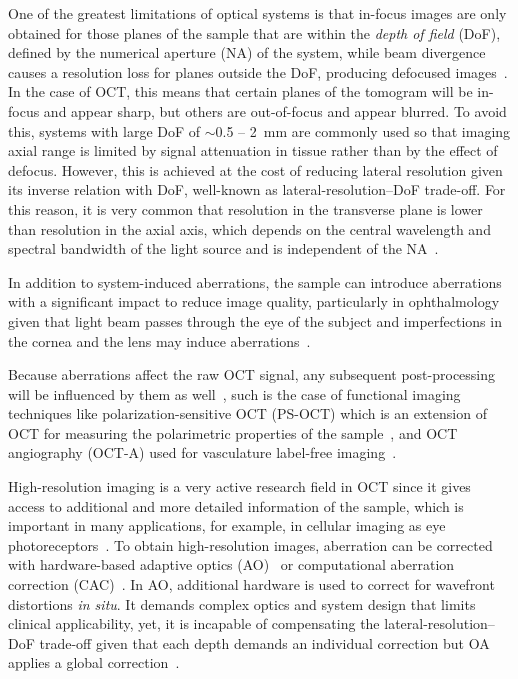 One of the greatest limitations of optical systems is that in-focus images are only obtained for those planes of the sample that are within the \textit{depth of field} (DoF), defined by the numerical aperture (NA) of the system, while beam divergence causes a resolution loss for planes outside the DoF, producing defocused images~\cite{Yasuno2006_Noniterative, Ralston2006_Interferometric}. In the case of OCT, this means that certain planes of the tomogram will be in-focus and appear sharp, but others are out-of-focus and appear blurred. To avoid this, systems with large DoF of $\sim$0.5 -- 2~mm are commonly used so that imaging axial range is limited by signal attenuation in tissue rather than by the effect of defocus. However, this is achieved at the cost of reducing lateral resolution given its inverse relation with DoF, well-known as lateral-resolution--DoF trade-off. For this reason, it is very common that resolution in the transverse plane is lower than resolution in the axial axis, which depends on the central wavelength and spectral bandwidth of the light source and is independent of the NA~\cite{Fujimoto2015_Introduction}.

In addition to system-induced aberrations, the sample can introduce aberrations with a significant impact to reduce image quality, particularly in ophthalmology given that light beam passes through the eye of the subject and imperfections in the cornea and the lens may induce aberrations~\cite{Walsh1984_Objective, Liang1997_Aberrations}.

Because aberrations affect the raw OCT signal, any subsequent post-processing will be influenced by them as well~\cite{Cense2009_Retinal, Park2020_Angiographic}, such is the case of functional imaging techniques like polarization-sensitive OCT (PS-OCT) which is an extension of OCT for measuring the polarimetric properties of the sample~\cite{deBoer1997_Twodimensional}, and OCT angiography (OCT-A) used for vasculature label-free imaging~\cite{Wang2007_Three}.

High-resolution imaging is a very active research field in OCT since it gives access to additional and more detailed information of the sample, which is important in many applications, for example, in cellular imaging as eye photoreceptors~\cite{Zhang2006_Highspeed}. To obtain high-resolution images, aberration can be corrected with hardware-based adaptive optics (AO)~\cite{Zawadzki2005_Adaptiveoptics} or computational aberration correction (CAC)~\cite{Adie2012_Computational}. In AO, additional hardware is used to correct for wavefront distortions \textit{in situ}. It demands complex optics and system design that limits clinical applicability, yet, it is incapable of compensating the lateral-resolution--DoF trade-off given that each depth demands an individual correction but OA applies a global correction~\cite{Pircher2017_Review}.

